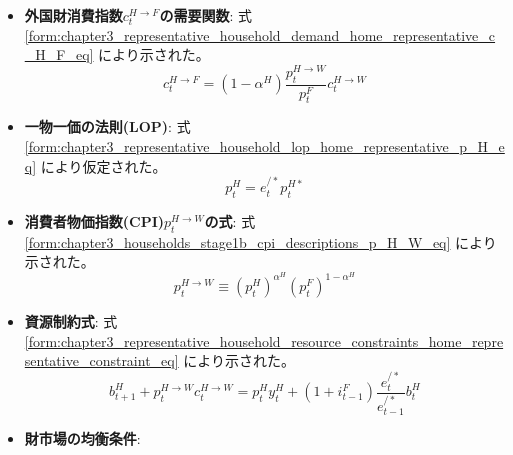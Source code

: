 \begin{itemize}
\begin{equation}
        \label{form:chapter5_two_plane_classification_external_c_H_H_eq}
            c_t^{H\to H}=\alpha^H\frac{p_t^{H\to W}}{p_t^H}c_t^{H\to W}
        \end{equation}
    \item
    \label{itm:chapter5_two_plane_classification_external_demand_foreign_goods}
        \textbf{外国財消費指数\(c_t^{H\to F}\)の需要関数}:
        式
        \eqref{form:chapter3_representative_household_demand_home_representative_c_H_F_eq}
        により示された。
        \begin{equation}
        \label{form:chapter5_two_plane_classification_external_c_H_F_eq}
            c_t^{H\to F}=(1-\alpha^H)\frac{p_t^{H\to W}}{p_t^F}c_t^{H\to W}
        \end{equation}
    \item
    \label{itm:chapter5_two_plane_classification_external_lop}
        \textbf{一物一価の法則(LOP)}:
        式
        \eqref{form:chapter3_representative_household_lop_home_representative_p_H_eq}
        により仮定された。
        \begin{equation}
        \label{form:chapter5_two_plane_classification_external_p_H_eq}
            p_t^H=e_t^{/*}p_t^{H*}
        \end{equation}
    \item
    \label{itm:chapter5_two_plane_classification_external_cpi}
        \textbf{消費者物価指数(CPI)\(p_t^{H\to W}\)の式}:
        式
        \eqref{form:chapter3_households_stage1b_cpi_descriptions_p_H_W_eq}
        により示された。
        \begin{equation}
        \label{form:chapter5_two_plane_classification_external_p_H_W_eq}
            p_t^{H\to W}\equiv(p_t^H)^{\alpha^H}(p_t^F)^{1-\alpha^H}
        \end{equation}
    \item
    \label{itm:chapter5_two_plane_classification_external_constraint}
        \textbf{資源制約式}:
        式
        \eqref{form:chapter3_representative_household_resource_constraints_home_representative_constraint_eq}
        により示された。
        \begin{equation}
        \label{form:chapter5_two_plane_classification_external_constraint_eq}
            b_{t+1}^H+p_t^{H\to W}c_t^{H\to W}=p_t^H y_t^H+(1+i_{t-1}^F)\frac{e_t^{/*}}{e_{t-1}^{/*}}b_t^H
        \end{equation}
    \item
    \label{itm:chapter5_two_plane_classification_external_goods_market}
        \textbf{財市場の均衡条件}:

\end{itemize}
